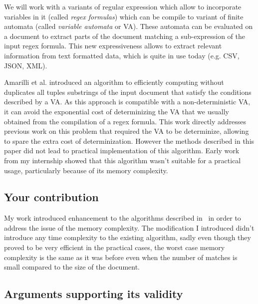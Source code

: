   We will work with a variants of regular expression which allow to incorporate
  variables in it (called \emph{regex formulas}) which can be compile to
  variant of finite automata (called \emph{variable automata} or VA). These
  automata can be evaluated on a document to extract parts of the document
  matching a sub-expression of the input regex formula. This new expressiveness
  allows to extract relevant information from text formatted data, which is
  quite in use today (e.g. CSV, JSON, XML).

  Amarilli et al.\cite{ICDT19} introduced an algorithm to efficiently computing
  without duplicates all tuples substrings of the input document that satisfy
  the conditions described by a VA\@. As this approach is compatible with a
  non-deterministic VA, it can avoid the exponential cost of determinizing the
  VA that we usually obtained from the compilation of a regex formula. This
  work directly addresses previous work on this problem that required the VA to
  be determinize, allowing to spare the extra cost of determinization. However
  the methods described in this paper did not lead to practical implementation
  of this algorithm. Early work from my internship showed that this algorithm
  wasn't suitable for a practical usage, particularly because of its memory
  complexity.

\subsection*{Your contribution}

  My work introduced enhancement to the algorithms described in~\cite{ICDT19}
  in order to address the issue of the memory complexity. The modification I
  introduced didn't introduce any time complexity to the existing algorithm,
  sadly even though they proved to be very efficient in the practical cases,
  the worst case memory complexity is the same as it was before even when the
  number of matches is small compared to the size of the document.


\subsection*{Arguments supporting its validity}


